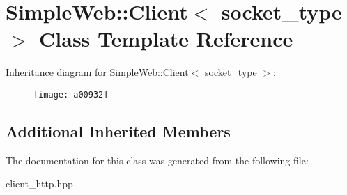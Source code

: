 \hypertarget{a00932}{}\section{Simple\+Web\+:\+:Client$<$ socket\+\_\+type $>$ Class Template Reference}
\label{a00932}
Inheritance diagram for Simple\+Web\+:\+:Client$<$ socket\+\_\+type $>$\+:\begin{figure}[H]
\begin{center}
\leavevmode
\texttt{[image: a00932]}
\end{center}
\end{figure}
\subsection*{Additional Inherited Members}


The documentation for this class was generated from the following file\+:\begin{DoxyCompactItemize}
\item 
client\+\_\+http.\+hpp\end{DoxyCompactItemize}
